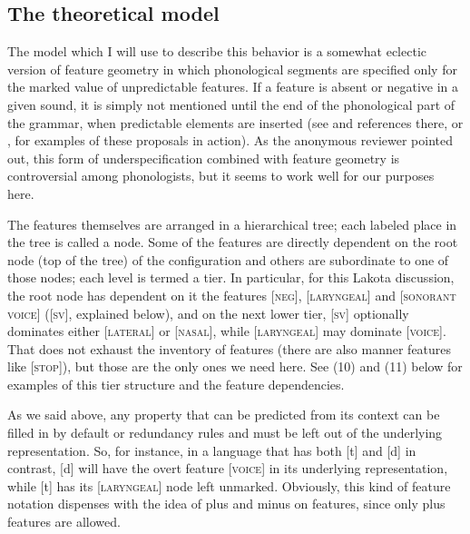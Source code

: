 \documentclass[output=paper]{LSP/langsci}
\begin{document}
\subsection{The theoretical model}

The model which I will use to describe this behavior is a somewhat eclectic version of feature geometry in which phonological segments are specified only for the marked value of unpredictable features. If a feature is absent or negative in a given sound, it is simply not mentioned until the end of the phonological part of the grammar, when predictable elements are inserted (see \citet{Rice1993} and references there, or \citet{Botma2011}, for examples of these proposals in action). As the anonymous reviewer pointed out, this form of underspecification combined with feature geometry is controversial among phonologists, but it seems to work well for our purposes here.

The features themselves are arranged in a hierarchical tree; each labeled place in the tree is called a node. Some of the features are directly dependent on the root node (top of the tree) of the configuration and others are subordinate to one of those nodes; each level is termed a tier. In particular, for this Lakota discussion, the root node has dependent on it the features [\textsc{neg}], [\textsc{laryngeal}] and [\textsc{sonorant voice}] ([\textsc{sv}], explained below), and on the next lower tier, [\textsc{sv}] optionally dominates either [\textsc{lateral}] or [\textsc{nasal}], while [\textsc{laryngeal}] may dominate [\textsc{voice}]. That does not exhaust the inventory of features (there are also manner features like [\textsc{stop}]), but those are the only ones we need here. See (10) and (11) below for examples of this tier structure and the feature dependencies.

As we said above, any property that can be predicted from its context can be filled in by default or redundancy rules and must be left out of the underlying representation. So, for instance, in a language that has both [t] and [d] in contrast, [d] will have the overt feature [\textsc{voice}] in its underlying representation, while [t] has its [\textsc{laryngeal}] node left unmarked. Obviously, this kind of feature notation dispenses with the idea of plus and minus on features, since only plus features are allowed.
\end{document}
